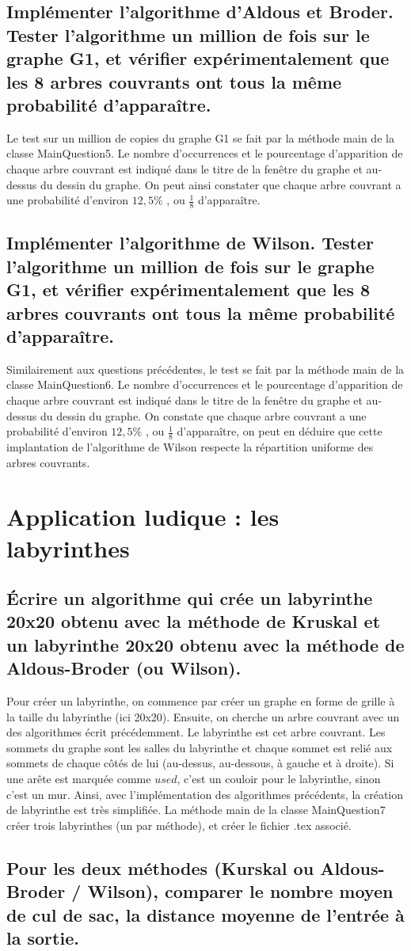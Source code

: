 \documentclass[11pt]{article}
\begin{document}
        \subsection{Implémenter l'algorithme d'Aldous et Broder.
        Tester l'algorithme un million de fois sur le graphe G1,
        et vérifier expérimentalement que les 8 arbres couvrants ont tous la même probabilité d'apparaître.}\label{subsec:Q5}
            Le test sur un million de copies du graphe G1 se fait par la méthode main de la classe MainQuestion5.
            Le nombre d'occurrences et le pourcentage d'apparition de chaque arbre couvrant est indiqué dans le titre de la fenêtre du graphe et au-dessus du dessin du graphe.
            On peut ainsi constater que chaque arbre couvrant a une probabilité d'environ $12,5\%$ , ou $\frac{1}{8}$ d'apparaître.
    
        \subsection{Implémenter l'algorithme de Wilson.
        Tester l'algorithme un million de fois sur le graphe G1,
        et vérifier expérimentalement que les 8 arbres couvrants ont tous la même probabilité d'apparaître.}\label{subsec:Q6}
            Similairement aux questions précédentes, le test se fait par la méthode main de la classe MainQuestion6.
            Le nombre d'occurrences et le pourcentage d'apparition de chaque arbre couvrant est indiqué dans le titre de la fenêtre du graphe et au-dessus du dessin du graphe.
            On constate que chaque arbre couvrant a une probabilité d'environ $12,5\%$ , ou $\frac{1}{8}$ d'apparaître,
            on peut en déduire que cette implantation de l'algorithme de Wilson respecte la répartition uniforme des arbres couvrants.

    \section{Application ludique : les labyrinthes}\label{sec:labyrinthes}
        \subsection{Écrire un algorithme qui crée un labyrinthe 20x20 obtenu avec la méthode de Kruskal
        et un labyrinthe 20x20 obtenu avec la méthode de Aldous-Broder (ou Wilson).}\label{subsec:Q7.}
            Pour créer un labyrinthe, on commence par créer un graphe en forme de grille à la taille du labyrinthe (ici 20x20).
            Ensuite, on cherche un arbre couvrant avec un des algorithmes écrit précédemment.
            Le labyrinthe est cet arbre couvrant.
            Les sommets du graphe sont les salles du labyrinthe et chaque sommet est relié aux sommets de chaque côtés de lui (au-dessus, au-dessous, à gauche et à droite).
            Si une arête est marquée comme $used$, c'est un couloir pour le labyrinthe, sinon c'est un mur.
            Ainsi, avec l'implémentation des algorithmes précédents, la création de labyrinthe est très simplifiée.
            La méthode main de la classe MainQuestion7 créer trois labyrinthes (un par méthode), et créer le fichier .tex associé.


        \subsection{Pour les deux méthodes (Kurskal ou Aldous-Broder / Wilson),
        comparer le nombre moyen de cul de sac, la distance moyenne de l'entrée à la sortie.}\label{subsec:Q8}
\end{document}
